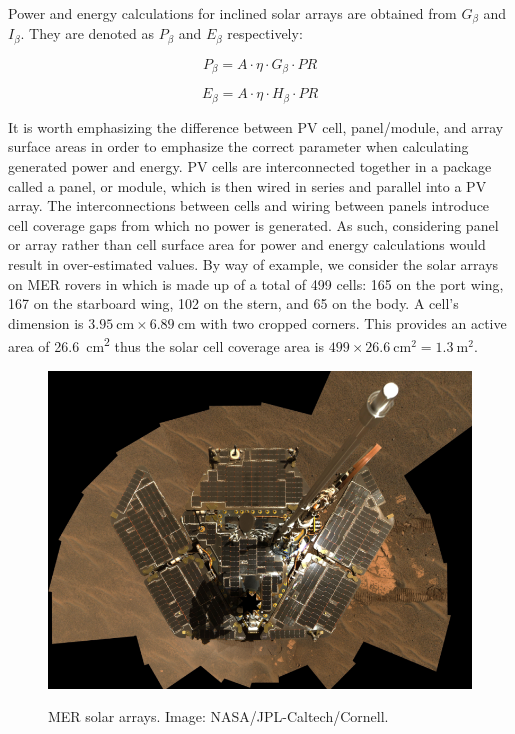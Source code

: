 Power and energy calculations for inclined solar arrays are obtained from $G_{\beta}$ and $I_{\beta}$. They are denoted as $P_{\beta}$ and $E_{\beta}$ respectively:

\begin{equation}
  \label{eq:SA_slope_power}
  P_{\beta} = A \cdot \eta \cdot G_{\beta} \cdot PR
\end{equation}


\begin{equation}
  \label{eq:SA_slope_energy}
  E_{\beta} = A \cdot \eta \cdot H_{\beta} \cdot PR
\end{equation}

It is worth emphasizing the difference between \ac{PV} cell, panel/module, and array surface areas in order to emphasize the correct parameter when calculating generated power and energy. \ac{PV} cells are interconnected together in a package called a panel, or module, which is then wired in series and parallel into a PV array. The interconnections between cells and wiring between panels introduce cell coverage gaps from which no power is generated. As such, considering panel or array rather than cell surface area for power and energy calculations would result in over-estimated values. By way of example, we consider the solar arrays on MER rovers in  which is made up of a total of 499 cells: 165 on the port wing, 167 on the starboard wing, 102 on the stern, and 65 on the body. A cell's dimension is $\SI{3.95}{\centi\meter} \times \SI{6.89}{\centi\meter}$ with two cropped corners. This provides an active area of \SI{26.6}{\centi\meter\squared} thus the solar cell coverage area is $499 \times \SI{26.6}{\centi\meter\squared} = \SI{1.3}{\meter\squared}$.


\begin{figure}[h]
  \centering
  \hypersetup{linkcolor=captionTextColor}
  \includegraphics[width=0.6\linewidth]{sections/mars-solar-energy/photovoltaic-energy/images/mer-solar-arrays.png}\\
  \caption[\ac{MER} solar arrays]
          {\ac{MER} solar arrays. Image: \ac{NASA}/\ac{JPL}-Caltech/Cornell.}
  \label{fig:image:mer-solar-arrays}
\end{figure}

